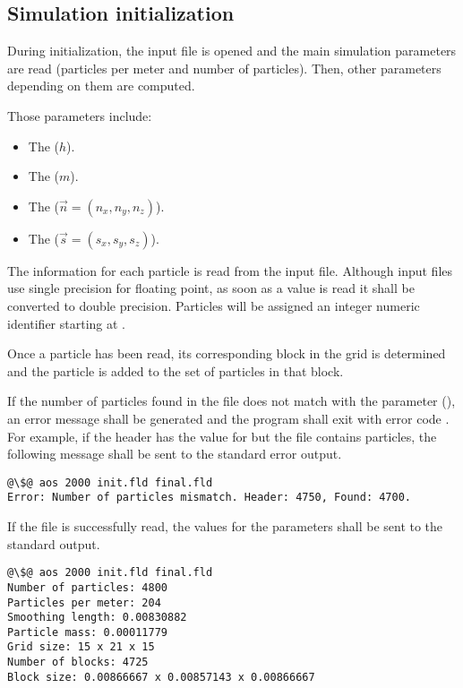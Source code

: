 \subsection{Simulation initialization}

During initialization, the input file is opened and the main simulation
parameters are read (particles per meter and number of particles).
Then, other parameters depending on them are computed.

Those parameters include:
\begin{itemize}
\item The  ($h$).
\item The  ($m$).
\item The  ($\vec{n} = (n_x, n_y, n_z)$).
\item The  ($\vec{s} = (s_x, s_y, s_z)$).
\end{itemize}

The information for each particle is read from the input file. Although input
files use single precision for floating point, as soon as a value is read it
shall be converted to double precision.  Particles will be assigned an integer
numeric identifier starting at .

Once a particle has been read, its corresponding block in the grid is determined
and the particle is added to the set of particles in that block. 

If the number of particles found in the file does not match with the parameter
 (), an error message shall be generated
and the program shall exit with error code . For example, if the 
header has the value  for  but the file contains 
 particles, the following message shall be sent to the standard
error output.

\begin{lstlisting}[style=terminal,escapechar=@]
@\$@ aos 2000 init.fld final.fld
Error: Number of particles mismatch. Header: 4750, Found: 4700.
\end{lstlisting}

If the file is successfully read, the values for the parameters shall be sent
to the standard output.

\begin{lstlisting}[style=terminal,escapechar=@]
@\$@ aos 2000 init.fld final.fld
Number of particles: 4800
Particles per meter: 204
Smoothing length: 0.00830882
Particle mass: 0.00011779
Grid size: 15 x 21 x 15
Number of blocks: 4725
Block size: 0.00866667 x 0.00857143 x 0.00866667
\end{lstlisting}

